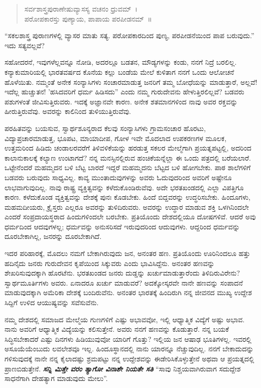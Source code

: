 \begin{verse}
 ಸರ್ವಶಾಸ್ತ್ರಪುರಾಣೇಷುವ್ಯಾಸಸ್ಯ ವಚನಂ ಧ್ರುವಮ್~।\\
 ಪರೋಪಕಾರಸ್ತು ಪುಣ್ಯಾಯ, ಪಾಪಾಯ ಪರಪೀಡನಮ್~॥ 
\end{verse}

“ಸಕಲಶಾಸ್ತ್ರ ಪುರಾಣಗಳಲ್ಲಿ ವ್ಯಾಸರ ಮಾತು ಸತ್ಯ. ಪರೋಪಕಾರದಿಂದ ಪುಣ್ಯ, ಪರಪೀಡನೆಯಿಂದ ಪಾಪ ಬರುವುದು.” ಇದು ಸತ್ಯವಲ್ಲವೆ?

ಸಹೋದರನೆ, ಇವುಗಳೆಲ್ಲವನ್ನೂ ನೋಡಿ, ಅದರಲ್ಲೂ ಬಡತನ, ಮೌಡ್ಯಗಳನ್ನು ಕಂಡು, ನನಗೆ ನಿದ್ರೆ ಬರಲಿಲ್ಲ. ಕನ್ಯಾಕುಮಾರಿಯಲ್ಲಿ ಭಾರತವರ್ಷದ ಕೊನೆಯ ಕಲ್ಲು ಬಂಡೆಯ ಮೇಲೆ ಕುಳಿತಾಗ ನನಗೆ ಒಂದು ಆಲೋಚನೆ ಹೊಳೆಯಿತು. ನಮ್ಮಂತೆ ಅನೇಕ ಸಂನ್ಯಾಸಿಗಳು ಸಂಚಾರಮಾಡುತ್ತ ಜನರಿಗೆ ತಮ್ಮ ಬೋಧೆಯನ್ನು ಮಾಡುತ್ತಾರೆ, ಅಲ್ಲವೆ! ಇದೆಲ್ಲ ಹುಚ್ಚುತನ! 'ಹಸಿದವರಿಗೆ ಧರ್ಮ ಹಿಡಿಸದು'' ಎಂದು ನಮ್ಮ ಗುರುದೇವನು ಹೇಳುತ್ತಿರಲಿಲ್ಲವೆ? ಬಡವರು ಪಶುಗಳಂತೆ ಜೀವಿಸುತ್ತಿರುವರು. ಇದಕ್ಕೆ ಅಜ್ಞಾನವೇ ಕಾರಣ. ಅನೇಕ ಶತಮಾನಗಳಿಂದ ನಾವು ಅವರ ರಕ್ತವನ್ನು ಹೀರುತ್ತಿರುವೆವು. ಅವರನ್ನು ಕಾಲಿನಿಂದ ತುಳಿಯುತ್ತಿರುವೆವು.

ಪರಹಿತವನ್ನು ಬಯಸುವ, ಸ್ವಾರ್ಥಶೂನ್ಯರಾದ ಕೆಲವು ಸಂನ್ಯಾಸಿಗಳು ಗ್ರಾಮಸಂಚಾರ ಹೊರಟು, ವಿದ್ಯಾಪ್ರಚಾರಮಾಡುತ್ತ, ಭೂಪಟ, ಮಾಯಾದೀಪ, ಗೋಳ ಇವೇ ಮೊದಲಾದ ಉಪಕರಣಗಳ ಮೂಲಕ, ಉತ್ತಮರಿಂದ ಹಿಡಿದು ಚಂಡಾಲರವರೆಗೆ ತಿಳಿವಳಿಕೆಯನ್ನು ಹರಡುತ್ತ ಸಕಲರ ಮೇಲ್ಮೆಗಾಗಿ ಪ್ರಯತ್ನಪಟ್ಟಲ್ಲಿ, ಅದರಿಂದ ಕಾಲಾನುಕಾಲಕ್ಕೆ ಕಲ್ಯಾಣ ಉಂಟಾಗದೆ? ನನ್ನ ಮನಸ್ಸಿನಲ್ಲಿರುವ ಹಂಚಿಕೆಯನ್ನೆಲ್ಲಾ ಈ ಒಂದು ಪತ್ರದಲ್ಲಿ ಬರೆಯಲಾರೆ. ಒಟ್ಟೇನೆಂದರೆ ಮಹಮ್ಮದನ ಬಳಿ ಬೆಟ್ಟ ಬಾರದೆ ಇದ್ದರೆ ಮಹಮ್ಮದನು ಬೆಟ್ಟದ ಬಳಿ ಹೋಗಬೇಕು. ಪಾಠ ಶಾಲೆಗಳಿಗೆ ಬಡವರು ಬರುವುದು ಸಾಧ್ಯವಿಲ್ಲ. ಕಾವ್ಯ ಮುಂತಾದುವುಗಳನ್ನು ಅವರು ಓದುವುದರಿಂದ ಅವರಿಗೆ ಅಷ್ಟೇನೂ ಲಾಭವಾಗುವುದಿಲ್ಲ. ನಾವು ರಾಷ್ಟ್ರ ವ್ಯಕ್ತಿತ್ವವನ್ನು ಕಳೆದುಕೊಂಡಿರುವೆವು. ಅದೇ ಭರತಖಂಡದಲ್ಲಿ ಎಲ್ಲಾ ವಿಪತ್ತಿಗೂ ಕಾರಣ. ಕಳೆದುಕೊಂಡ ವ್ಯಕ್ತಿತ್ವವನ್ನು ದೇಶಕ್ಕೆ ಪುನಃ ಕೊಡಬೇಕು. ಹಿಂದೆ ಬಿದ್ದವರನ್ನು ಉದ್ಧರಿಸಬೇಕು. ಹಿಂದೂಗಳು, ಮಹಮದೀಯರು, ಕ್ರೈಸ್ತರು ಎಲ್ಲರೂ ಅವರನ್ನು ತುಳಿದಿರುವರು. ಅವರನ್ನು ಉದ್ಧಾರ ಮಾಡುವ ಶಕ್ತಿ ಒಳಗಿನಿಂದಲೇ ಎಂದರೆ ಸಂಪ್ರದಾಯಸ್ಥರಾದ ಹಿಂದುಗಳಿಂದಲೇ ಬರಬೇಕು. ಪ್ರತಿಯೊಂದು ದೇಶದಲ್ಲಿಯೂ ದೋಷಗಳಿವೆ. ಆದರೆ ಅವು ಧರ್ಮದಿಂದ ಆದವುಗಳಲ್ಲ; ಧರ್ಮವನ್ನು ಅನುಸರಿಸದೆ ಇರುವುದರಿಂದ ಆದುವುಗಳು. ಆದ್ದರಿಂದ ಧರ್ಮವನ್ನು ದೂರಬೇಕಾಗಿಲ್ಲ, ಜನರನ್ನು ದೂರಬೇಕಾಗಿದೆ.

ಇದರ ಪರಿಹಾರಕ್ಕೆ, ಮೊದಲು ನಮಗೆ ಬೇಕಾಗಿರುವುದು ಜನ, ಅನಂತರ ಹಣ. ಪ್ರತಿಯೊಂದು ಊರಿನಿಂದಲೂ ಹತ್ತು ಹದಿನೈದು ಜನರು ಗುರುದೇವನ ಕೃಪೆಯಿಂದ ಸಿಕ್ಕುವರು ಎಂದು ಭಾವಿಸಿದ್ದೆನು. ಅನಂತರ ಹಣವನ್ನು ಶೇಖರಿಸುವುದಕ್ಕಾಗಿ ಹೊರಟೆನು. ಭರತಖಂಡದ ಜನರು ದುಡ್ಡನ್ನು ಖರ್ಚುಮಾಡುತ್ತಾರೆಂದು ತಿಳಿದಿರುವಿರೇನು? ಸ್ವಾರ್ಥಮೂರ್ತಿಗಳು ಅವರು. ಏನಾದರೂ ಖರ್ಚು ಮಾಡುವರೆ? ಅದಕ್ಕೋಸ್ಕರವೇ ನಾನೇ ಹಣವನ್ನು ಸಂಪಾದನೆ ಮಾಡುವುದಕ್ಕಾಗಿ ಅಮೆರಿಕಾ ದೇಶಕ್ಕೆ ಬಂದಿರುವೆನು. ಅನಂತರ ಭಾರತಕ್ಕೆ ಹಿಂದಿರುಗಿ ನನ್ನ ಜೀವನದ ಮುಖ್ಯ ಉದ್ದೇಶ ಸಿದ್ದಿಗೆ ಉಳಿದ ಆಯುಷ್ಯವನ್ನು ಸವೆಸುವೆನು.

\vspace{0.1cm}

ನಮ್ಮ ದೇಶದಲ್ಲಿ ಸಮಾಜದ ಮೇಲ್ಮೆಯ ಗುಣಗಳಿಗೆ ಎಷ್ಟು ಅಭಾವವೋ, ಇಲ್ಲಿ ಆಧ್ಯಾತ್ಮಿಕ ವಿದ್ಯೆಗೆ ಅಷ್ಟು ಅಭಾವ. ನಾನು ಅವರಿಗೆ ಆಧ್ಯಾತ್ಮಿಕ ವಿದ್ಯೆಯನ್ನು ಕಲಿಸುತ್ತೇನೆ. ಅವರು ನನಗೆ ಹಣವನ್ನು ಕೊಡುತ್ತಾರೆ. ನನ್ನ ಬಯಕೆ ಸಿದ್ಧಿಸಬೇಕಾದರೆ ಎಷ್ಟು ದಿನಗಳು ಹಿಡಿಯುವುವೋ ಯಾರಿಗೆ ಗೊತ್ತು? ಇಲ್ಲಿಯ ಜನ ಆಷಾಢ ಭೂತಿಗಳಲ್ಲ. ಇವರಲ್ಲಿ ಅಸೂಯೆಯೆಂಬುದು ಲವಲೇಶವೂ ಇಲ್ಲ. ಹಿಂದೂಸ್ಥಾನದಲ್ಲಿ ನಾನು ಯಾರನ್ನೂ ನೆಚ್ಚುವುದಿಲ್ಲ. ನನಗೆ ಬೇಕಾದುದನ್ನು ಗಳಿಸುವುದಕ್ಕೆ ನಾನೇ ನನ್ನ ಕೈಲಾದಷ್ಟು ಶ್ರಮಪಟ್ಟು ನನ್ನ ಉದ್ದೇಶವನ್ನು ಈಡೇರಿಸಿಕೊಳ್ಳುತ್ತೇನೆ ಅಥವಾ ಆ ಪ್ರಯತ್ನದಲ್ಲಿ ಪ್ರಾಣಬಿಡುತ್ತೇನೆ. \textbf{\textit{ಸನ್ನಿ ಮಿತ್ತೇ ವರಂ ತ್ಯಾಗೋ ವಿನಾಶೇ ನಿಯತೇ ಸತಿ}} \enginline{-} “ಸಾವು ನಿಶ್ಚಯವಾಗಿರುವಾಗ ಸದುದ್ದೇಶ ಸಾಧನೆಗಾಗಿ ದೇಹತ್ಯಾಗ ಮಾಡುವುದು ಮೇಲು”.

